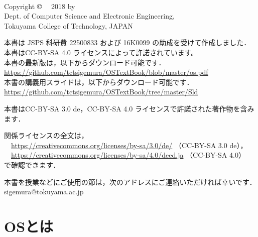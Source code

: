 \documentclass[a4paper,11pt,twocolumn]{ltjsbook}     %
\begin{document}
\thispagestyle{empty}
\onecolumn
~
\vfill
\begin{flushleft}
Copyright \copyright ~~ 2018 by \\
Dept. of Computer Science and Electronic Engineering, \\
Tokuyama College of Technology, JAPAN
\end{flushleft}
\vspace{0.4cm}
\begin{flushleft}
本書は JSPS 科研費 22500833 および 16K0099 の助成を受けて作成しました．\\
本書はCC-BY-SA 4.0 ライセンスによって許諾されています。\\
本書の最新版は，以下からダウンロード可能です．\\
\url{https://github.com/tctsigemura/OSTextBook/blob/master/os.pdf}\\
本書の講義用スライドは，以下からダウンロード可能です．\\
\url{https://github.com/tctsigemura/OSTextBook/tree/master/Sld}
\end{flushleft}
\begin{flushleft}
本書はCC-BY-SA 3.0 de，CC-BY-SA 4.0 ライセンスで許諾された著作物を含みます．
\end{flushleft}
\begin{flushleft}
関係ライセンスの全文は，\\
　\url{https://creativecommons.org/licenses/by-sa/3.0/de/}
（CC-BY-SA 3.0 de），\\
　\url{https://creativecommons.org/licenses/by-sa/4.0/deed.ja}
（CC-BY-SA 4.0）\\
で確認できます．
\end{flushleft}
\begin{flushleft}
本書を授業などにご使用の節は，次のアドレスにご連絡いただければ幸いです．\\
sigemura@tokuyama.ac.jp
\end{flushleft}

\setcounter{tocdepth}{1}
\tableofcontents

\mainmatter

\part{OSとは}
\end{document}

